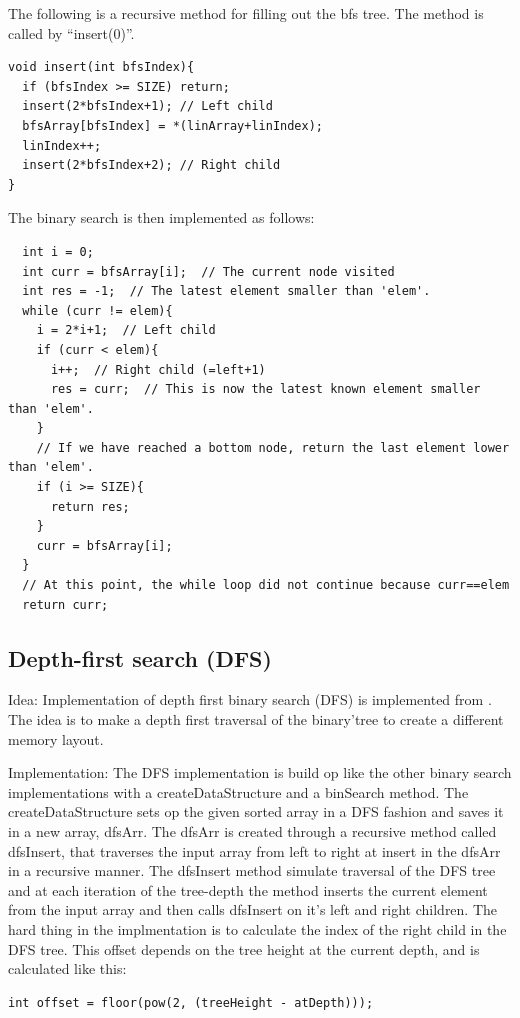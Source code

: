 The following is a recursive method for filling out the bfs tree. The method is called by ``insert(0)''.
\begin{verbatim}
void insert(int bfsIndex){
  if (bfsIndex >= SIZE) return;
  insert(2*bfsIndex+1); // Left child
  bfsArray[bfsIndex] = *(linArray+linIndex);
  linIndex++;
  insert(2*bfsIndex+2); // Right child
}
\end{verbatim}


The binary search is then implemented as follows:
\begin{verbatim}
  int i = 0;
  int curr = bfsArray[i];  // The current node visited
  int res = -1;  // The latest element smaller than 'elem'.
  while (curr != elem){
    i = 2*i+1;  // Left child
    if (curr < elem){
      i++;  // Right child (=left+1)
      res = curr;  // This is now the latest known element smaller than 'elem'.
    }
    // If we have reached a bottom node, return the last element lower than 'elem'.
    if (i >= SIZE){
      return res;
    }
    curr = bfsArray[i];
  }
  // At this point, the while loop did not continue because curr==elem
  return curr;
\end{verbatim}




\subsection{Depth-first search (DFS)}
Idea:
Implementation of depth first binary search (DFS) is implemented from \citep{binAlg}. The idea is to make a depth first traversal of the binary'tree to create a different memory layout. 

Implementation:
The DFS implementation is build op like the other binary search implementations with a createDataStructure and a binSearch 
method. The createDataStructure sets op the given sorted array in a DFS fashion and saves it in a new array, dfsArr. 
The dfsArr is created through a recursive method called dfsInsert, that traverses the input array from left to right at insert in the dfsArr in a recursive manner. The dfsInsert method simulate traversal of the DFS tree and at each iteration of the tree-depth the method inserts the current element from the input array and then calls dfsInsert on it's left and right children. The hard thing in the implmentation is to calculate the index of the right child in the DFS tree. This offset depends on the tree height at the current depth, and is calculated like this:
\begin{verbatim}
int offset = floor(pow(2, (treeHeight - atDepth)));
\end{verbatim}

